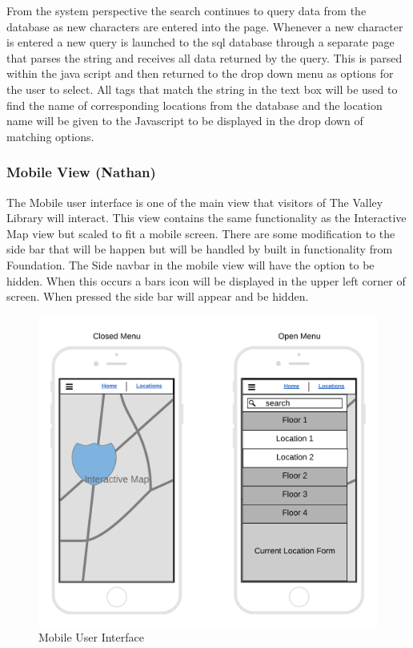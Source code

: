 \documentclass[letterpaper,10pt,titlepage, onecolumn, compsoc]{IEEEtran}
\begin{document}
From the system perspective the search continues to query data from the database as new characters are entered into the page. Whenever a new character is entered a new query is launched to the sql database through a separate page that parses the string and receives all data returned by the query. This is parsed within the java script and then returned to the drop down menu as options for the user to select. All tags that match the string in the text box will be used to find the name of corresponding locations from the database and the location name will be given to the Javascript  to be displayed in the drop down of matching options.

\subsubsection{Mobile View (Nathan)}
The Mobile user interface is one of the main view that visitors of The Valley Library will interact. This view contains the same functionality as the Interactive Map view but scaled to fit a mobile screen. There are some modification to the side bar that will be happen but will be handled by built in functionality from Foundation. The Side navbar in the mobile view will have the option to be hidden. When this occurs a bars icon will be displayed in the upper left corner of screen. When pressed the side bar will appear and be hidden. 

\begin{figure}[h!]
\centering
\includegraphics[scale=.6\textwidth,natwidth=2094,natheight=1914]{images/mobile-user-interface.png}
\caption{Mobile User Interface}
\label{fig:method}
\end{figure}
\end{document}
